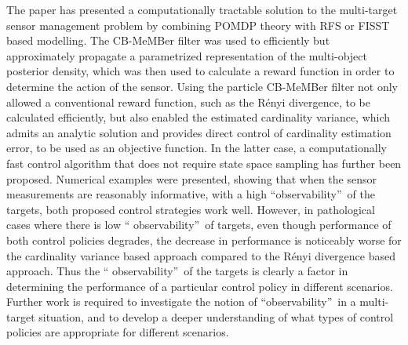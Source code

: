 \documentclass[twocolumn]{autart}
\begin{document}
The paper has presented a computationally tractable solution to the
multi-target sensor management problem by combining POMDP theory with RFS or
FISST based modelling. The CB-MeMBer filter was used to efficiently but
approximately propagate a parametrized representation of the multi-object
posterior density, which was then used to calculate a reward function in
order to determine the action of the sensor. Using the particle CB-MeMBer
filter not only allowed a conventional reward function, such as the R\'{e}nyi divergence, to be calculated efficiently, but also enabled the estimated
cardinality variance, which admits an analytic solution and provides direct
control of cardinality estimation error, to be used as an objective function. In
the latter case, a computationally fast control algorithm that does not
require state space sampling has further been proposed. Numerical examples
were presented, showing that when the sensor measurements are reasonably
informative, with a high \textquotedblleft observability\textquotedblright\
of the targets, both proposed control strategies work well. However, in
pathological cases where there is low \textquotedblleft
observability\textquotedblright\ of targets, even though performance of both
control policies degrades, the decrease in performance is noticeably worse
for the cardinality variance based approach compared to the R\'{e}nyi
divergence based approach. Thus the \textquotedblleft
observability\textquotedblright\ of the targets is clearly a factor in
determining the performance of a particular control policy in different
scenarios. Further work is required to investigate the notion of
\textquotedblleft observability\textquotedblright\ in a multi-target
situation, and to develop a deeper understanding of what types of control
policies are appropriate for different scenarios.
\end{document}
